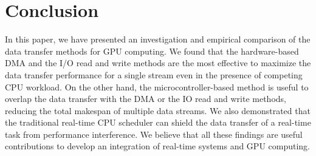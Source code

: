 \section{Conclusion}
\label{sec:conclusion}

In this paper, we have presented an investigation and empirical
comparison of the data transfer methods for GPU computing.
We found that the hardware-based DMA and the I/O read and write methods
are the most effective to maximize the data transfer performance for a
single stream even in the presence of competing CPU workload.
On the other hand, the microcontroller-based method is useful to overlap
the data transfer with the DMA or the IO read and write methods,
reducing the total makespan of multiple data streams.
We also demonstrated that the traditional real-time CPU scheduler can
shield the data transfer of a real-time task from performance
interference.
We believe that all these findings are useful contributions to develop
an integration of real-time systems and GPU computing.